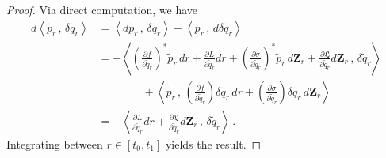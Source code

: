 \documentclass[10pt,a4paper]{amsart}
\newcommand{\mc}[1]{\mathcal{#1}}
\newcommand{\mcal}[1]{\mc{#1}}
\def\p{{\partial}}
\def\rmd{{\rm d}}
\newcommand{\scp}[2]{{\left\langle {#1}\, , \, {#2}\right\rangle}}
\newcommand{\wt}[1]{\widetilde{#1}}
\begin{document}
\begin{proof}
Via direct computation, we have
    \begin{align*}
        d\scp{\wt{p}_r}{\delta\wt{q}_r}
        &= \scp{d\wt{p}_r}{\delta\wt{q}_r} + \scp{\wt{p}_r}{d\delta\wt{q}_r}\\
        &= -\scp{\left(\frac{\p f}{\p \wt{q}_r}\right)^*\wt{p}_r\,dr + \frac{\p L}{\p \wt{q}_r}dr + \left(\frac{\p \sigma}{\p \wt{q}_r}\right)^* \wt{p}_r\,d\mathbf{Z}_r + \frac{\p \mathfrak{L}}{\p \wt{q}_r}d\mathbf{Z}_r}{\delta\wt{q}_r} \\
        & \qquad \qquad + \scp{\wt{p}_r}{\left(\frac{\p f}{\p \wt{q}_r}\right)\delta\wt{q}_r \,dr + \left(\frac{\p \sigma}{\p \wt{q}_r}\right)\delta\wt{q}_r \,d\mathbf{Z}_r}\\
        & = -\scp{\frac{\p L}{\p \wt{q}_r}dr + \frac{\p \mathfrak{L}}{\p \wt{q}_r}d\mathbf{Z}_r}{\delta \wt{q}_r}\,.
    \end{align*}
    Integrating between $r\in[t_0,t_1]$ yields the result.
\end{proof}
\end{document}

